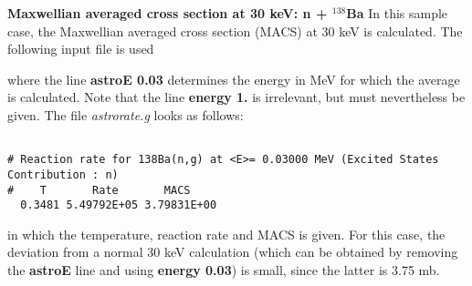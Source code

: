 \begin{samplecase}
{\bf Maxwellian averaged cross section at 30 keV: n + ${}^{138}$Ba}\newline
In this sample case, the Maxwellian averaged cross section (MACS) at 30 keV is calculated.
The following input file is used


where the line {\bf astroE 0.03} determines the energy in MeV for which the
average is calculated. Note that the line {\bf energy 1.} is irrelevant, 
but must nevertheless be given.
The file {\em astrorate.g} looks as follows:
{\small \begin{verbatim}

# Reaction rate for 138Ba(n,g) at <E>= 0.03000 MeV (Excited States Contribution : n)
#    T       Rate       MACS
  0.3481 5.49792E+05 3.79831E+00
\end{verbatim} } \renewcommand{\baselinestretch}{1.07}\small\normalsize
\noindent
in which the temperature, reaction rate and MACS is given.
For this case, the deviation from a normal 30 keV calculation (which can be 
obtained by removing the {\bf astroE} line and using {\bf energy 0.03}) is 
small, since the latter is 3.75 mb.
\end{samplecase}
